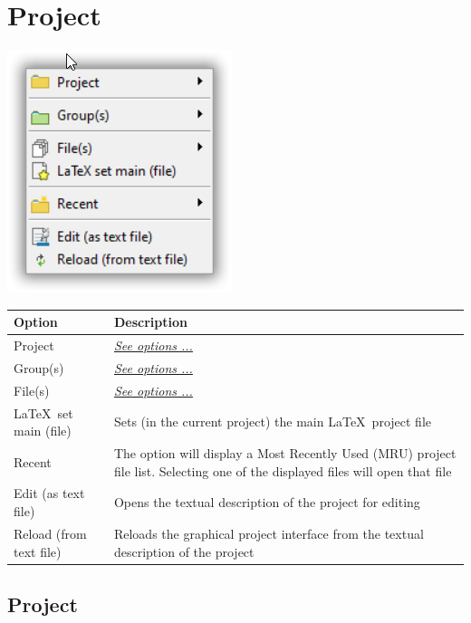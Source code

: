 
\hypertarget{menu_project}{}
\section{Project}

\includegraphics[scale=0.50]{./res/menu_project.png}\\

\begin{scriptsize}\begin{tabularx}{\textwidth}{>{\hsize=0.3\hsize}X>{\hsize=0.8\hsize}X}\\
    \hline
    \textbf{Option} & \textbf{Description} \\
    \hline
    Project & \textit{\href{\#menu\_project\_project}{See options ...}} \\
    Group(s) & \textit{\href{\#menu\_project\_group}{See options ...}} \\
    File(s) & \textit{\href{\#menu\_project\_file}{See options ...}} \\
    \LaTeX ~set main (file) & Sets (in the current project) the main \LaTeX ~project file \\
    Recent & The option will display a Most Recently Used (MRU) project file list. Selecting one of the displayed files will open that file \\
    Edit (as text file) & Opens the textual description of the project for editing \\
    Reload (from text file) & Reloads the graphical project interface from the textual description of the project \\
    \hline
  \end{tabularx}\end{scriptsize}


\hypertarget{menu_project_project}{}
\subsection{Project}

